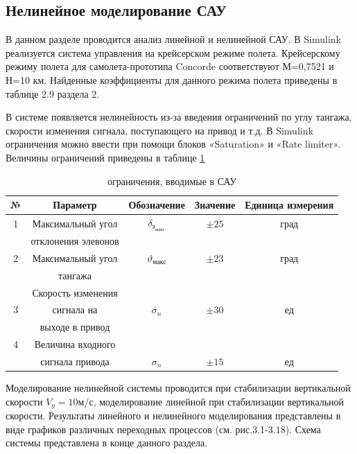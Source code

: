 \subsection{Нелинейное моделирование САУ}

В данном разделе проводится анализ линейной и нелинейной САУ. В Simulink реализуется система управления на крейсерском режиме полета. Крейсерскому режиму полета для самолета-прототипа Concorde соответствуют М=0,7521 и Н=10 км. Найденные коэффициенты для данного режима полета приведены в таблице 2.9 раздела 2. 

В системе появляется нелинейность из-за введения ограничений по углу тангажа, скорости изменения сигнала, поступающего на привод и т.д. В Simulink ограничения можно ввести при помощи блоков «Saturation» и «Rate limiter». Величины ограничений приведены в таблице \ref{tab:Нелинейности}

\begin{table}[H]
    \centering
    \caption{ограничения, вводимые в САУ}
    \begin{tabular}{|c|c|c|c|c|}
    \hline
        № & Параметр & Обозначение & Значение & Единица измерения \\ \hline
        1 & Максимальный угол & $\delta_\text{э}_\text{макс}$ & $\pm 25$ & град \\ 
         & отклонения элевонов &  &  & \\ \hline
        2 & Максимальный угол & $\vartheta_\text{макс}$ & $\pm 23$ & град\\
         & тангажа &  &  & \\ \hline
         & Скорость изменения &  &  & \\ 
        3 & сигнала на & $\dot{\sigma_n}$ & $\pm 30$ &ед \\ 
        & выходе в привод &  &  & \\ \hline
        4 & Величина входного &  &  & \\ 
         & сигнала привода & $\sigma_n$ & $\pm 15$ &ед \\ \hline
    \end{tabular}
    \label{tab:Нелинейности}
\end{table}

Моделирование нелинейной системы проводится при стабилизации вертикальной скорости $V_y = 10$м/с, моделирование линейной при стабилизации вертикальной скорости. Результаты линейного и нелинейного моделирования представлены в виде графиков различных переходных процессов (см. рис.3.1-3.18). Схема системы представлена в конце данного раздела.

